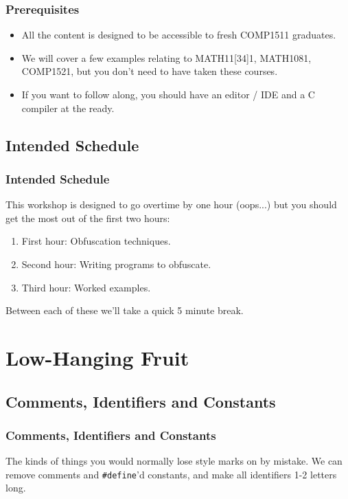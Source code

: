\documentclass[handout,xcolor]{beamer}
\begin{document}
\begin{frame}
	\frametitle{Prerequisites}
	\pause
	
	\begin{itemize}
		\item All the content is designed to be accessible to fresh COMP1511 graduates.
		\pause
		\item We will cover a few examples relating to MATH11[34]1, MATH1081, COMP1521, but you don't need to have taken these courses.
		\pause
		\item If you want to follow along, you should have an editor / IDE and a C compiler at the ready.
	\end{itemize}
\end{frame}

\subsection{Intended Schedule}

\begin{frame}
	\frametitle{Intended Schedule}
	\pause
	
	This workshop is designed to go overtime by one hour (oops...) but you should get the most out of the first two hours:
	\pause
	
	\begin{enumerate}
		\item First hour: Obfuscation techniques.
		\pause
		\item Second hour: Writing programs to obfuscate.
		\pause
		\item Third hour: Worked examples.
	\end{enumerate}
	\pause
	
	Between each of these we'll take a quick 5 minute break.
\end{frame}

\section{Low-Hanging Fruit}

\subsection{Comments, Identifiers and Constants}

\begin{frame}
	\frametitle{Comments, Identifiers and Constants}
	\pause
	
	The kinds of things you would normally lose style marks on by mistake. We can remove comments and \texttt{\#define}'d constants, and make all identifiers 1-2 letters long.
	\pause
	
	\begin{columns}
		\begin{column}{0.45\textwidth}
			\centering
			
		\end{column}
		\pause
		\begin{column}{0.45\textwidth}
			\centering
			
		\end{column}
	\end{columns}
\end{frame}
\end{document}
